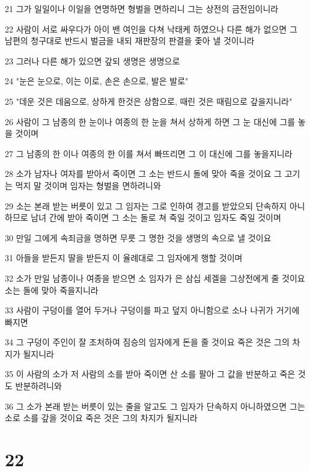 \par 21 그가 일일이나 이일을 연명하면 형벌을 면하리니 그는 상전의 금전임이니라
\par 22 사람이 서로 싸우다가 아이 밴 여인을 다쳐 낙태케 하였으나 다른 해가 없으면 그 남편의 청구대로 반드시 벌금을 내되 재판장의 판결을 좇아 낼 것이니라
\par 23 그러나 다른 해가 있으면 갚되 생명은 생명으로
\par 24 "눈은 눈으로, 이는 이로, 손은 손으로, 발은 발로"
\par 25 "데운 것은 데움으로, 상하게 한것은 상함으로, 때린 것은 때림으로 갚을지니라"
\par 26 사람이 그 남종의 한 눈이나 여종의 한 눈을 쳐서 상하게 하면 그 눈 대신에 그를 놓을 것이며
\par 27 그 남종의 한 이나 여종의 한 이를 쳐서 빠뜨리면 그 이 대신에 그를 놓을지니라
\par 28 소가 남자나 여자를 받아서 죽이면 그 소는 반드시 돌에 맞아 죽을 것이요 그 고기는 먹지 말 것이며 임자는 형벌을 면하려니와
\par 29 소는 본래 받는 버릇이 있고 그 임자는 그로 인하여 경고를 받았으되 단속하지 아니하므로 남녀 간에 받아 죽이면 그 소는 돌로 쳐 죽일 것이고 임자도 죽일 것이며
\par 30 만일 그에게 속죄금을 명하면 무릇 그 명한 것을 생명의 속으로 낼 것이요
\par 31 아들을 받든지 딸을 받든지 이 율례대로 그 임자에게 행할 것이며
\par 32 소가 만일 남종이나 여종을 받으면 소 임자가 은 삼십 세겔을 그상전에게 줄 것이요 소는 돌에 맞아 죽을지니라
\par 33 사람이 구덩이를 열어 두거나 구덩이를 파고 덮지 아니함으로 소나 나귀가 거기에 빠지면
\par 34 그 구덩이 주인이 잘 조처하여 짐승의 임자에게 돈을 줄 것이요 죽은 것은 그의 차지가 될지니라
\par 35 이 사람의 소가 저 사람의 소를 받아 죽이면 산 소를 팔아 그 값을 반분하고 죽은 것도 반분하려니와
\par 36 그 소가 본래 받는 버릇이 있는 줄을 알고도 그 임자가 단속하지 아니하였으면 그는 소로 소를 갚을 것이요 죽은 것은 그의 차지가 될지니라

\chapter{22}

